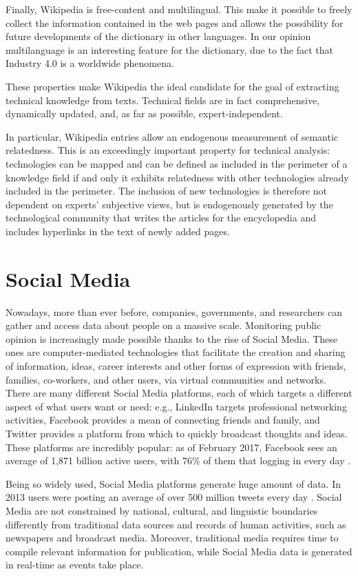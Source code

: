 \documentclass[b5paper,]{book}
\theoremstyle{definition}
\theoremstyle{definition}
\theoremstyle{definition}
\theoremstyle{remark}
\begin{document}
Finally, Wikipedia is free-content and multilingual. This make it
possible to freely collect the information contained in the web pages
and allows the possibility for future developments of the dictionary in
other languages. In our opinion multilanguage is an interesting feature
for the dictionary, due to the fact that Industry 4.0 is a worldwide
phenomena.

These properties make Wikipedia the ideal candidate for the goal of
extracting technical knowledge from texts. Technical fields are in fact
comprehensive, dynamically updated, and, as far as possible,
expert-independent.

In particular, Wikipedia entries allow an endogenous measurement of
semantic relatedness. This is an exceedingly important property for
technical analysis: technologies can be mapped and can be defined as
included in the perimeter of a knowledge field if and only it exhibits
relatedness with other technologies already included in the perimeter.
The inclusion of new technologies is therefore not dependent on experts'
subjective views, but is endogenously generated by the technological
community that writes the articles for the encyclopedia and includes
hyperlinks in the text of newly added pages.

\section{Social Media}\label{sotadocumentstwitter}

Nowadays, more than ever before, companies, governments, and researchers
can gather and access data about people on a massive scale. Monitoring
public opinion is increasingly made possible thanks to the rise of
Social Media. These ones are computer-mediated technologies that
facilitate the creation and sharing of information, ideas, career
interests and other forms of expression with friends, families,
co-workers, and other users, via virtual communities and networks. There
are many different Social Media platforms, each of which targets a
different aspect of what users want or need: e.g., LinkedIn targets
professional networking activities, Facebook provides a mean of
connecting friends and family, and Twitter provides a platform from
which to quickly broadcast thoughts and ideas. These platforms are
incredibly popular: as of February 2017, Facebook sees an average of
1,871 billion active users, with 76\% of them that logging in every day
\citep{tuten2017social}.

Being so widely used, Social Media platforms generate huge amount of
data. In 2013 users were posting an average of over 500 million tweets
every day \citep{krikorian2013new}. Social Media are not constrained by
national, cultural, and linguistic boundaries differently from
traditional data sources and records of human activities, such as
newspapers and broadcast media. Moreover, traditional media requires
time to compile relevant information for publication, while Social Media
data is generated in real-time as events take place.
\end{document}
